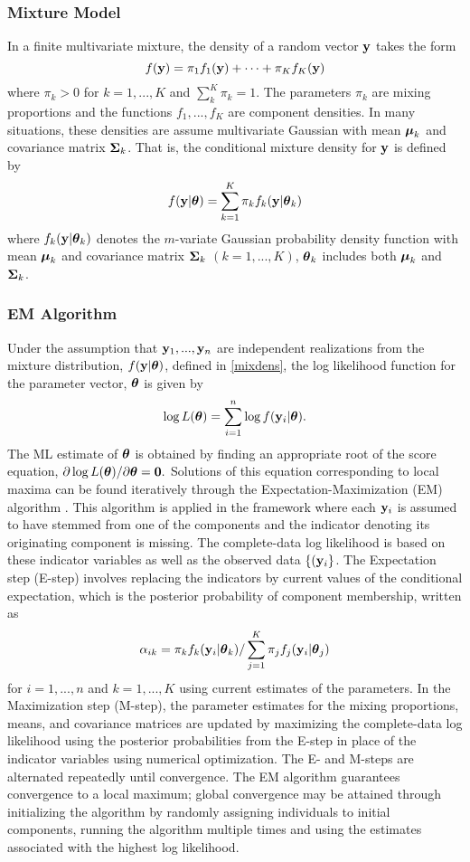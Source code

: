 \subsubsection{Mixture Model}
In a finite multivariate mixture, the density of a random vector $\mathbf y$ takes the form
$$f(\mathbf y)=\pi_{1}f_{1}(\mathbf y)+\cdots+\pi_{K}f_{K}(\mathbf y)$$
where $\pi_{k}>0$ for $k=1,...,K$ and $\sum^{K}_{k}\pi_{k}=1$. The parameters $\pi_{k}$ are mixing proportions and the functions $f_{1},...,f_{K}$ are component densities. In many situations, these densities are assume multivariate Gaussian with mean $\boldsymbol\mu_{k}$ and covariance matrix $\boldsymbol\Sigma_{k}$. That is, the conditional mixture density for $\mathbf y$ is defined by
\begin{align}
f(\mathbf y|\boldsymbol \theta)=\sum^{K}_{k=1}\pi_{k}f_{k}(\mathbf y|\boldsymbol\theta_{k}) \label{mixdens}
\end{align}
where $f_{k}(\mathbf y|\boldsymbol\theta_{k})$ denotes the $m$-variate Gaussian probability density function with mean $\boldsymbol\mu_{k}$ and covariance matrix $\boldsymbol\Sigma_{k}$ $(k=1,...,K)$, $\boldsymbol\theta_{k}$ includes both $\boldsymbol\mu_{k}$ and $\boldsymbol\Sigma_{k}$. 
\subsubsection{EM Algorithm}
Under the assumption that $\mathbf y_{1},...,\mathbf y_{n}$ are independent realizations from the mixture distribution, $f(\mathbf y | \boldsymbol\theta)$, defined in \ref{mixdens}, the log likelihood function for the parameter vector, $\boldsymbol \theta$ is given by
$$\log L(\boldsymbol\theta)=\sum^{n}_{i=1}\log f(\mathbf y_{i}|\boldsymbol \theta).$$
The ML estimate of $\boldsymbol\theta$ is obtained by finding an appropriate root of the score equation, $\partial \log L(\boldsymbol\theta)/\partial \boldsymbol\theta=\mathbf 0.$
Solutions of this equation corresponding to local maxima can be found iteratively through the Expectation-Maximization (EM) algorithm \cite{dempster1977}. This algorithm is applied in the framework where each $\mathbf y_{i}$ is assumed to have stemmed from one of the components and the indicator denoting its originating component is missing. The complete-data log likelihood is based on these indicator variables as well as the observed data $\{(\mathbf y_{i}\}$. The Expectation step (E-step) involves replacing the indicators by current values of the conditional expectation, which is the posterior probability of component membership, written as
$$\alpha_{ik}=\pi_{k}f_{k}(\mathbf y_{i}|\boldsymbol\theta_{k})/\sum_{j=1}^{K}\pi_{j}f_{j}(\mathbf y_{i}|\boldsymbol \theta_{j})$$
for $i=1,...,n$ and $k=1,...,K$ using current estimates of the parameters. In the Maximization step (M-step), the parameter estimates for the mixing proportions, means, and covariance matrices are updated by maximizing the complete-data log likelihood using the posterior probabilities from the E-step in place of the indicator variables using numerical optimization. The E- and M-steps are alternated repeatedly until convergence. The EM algorithm guarantees convergence to a local maximum; global convergence may be attained through initializing the algorithm by randomly assigning individuals to initial components, running the algorithm multiple times and using the estimates associated with the highest log likelihood.

